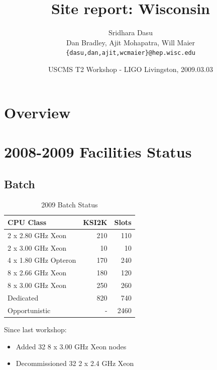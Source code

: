 \documentclass{beamer}
\title{Site report: Wisconsin}
\author[Maier]{
    Sridhara Dasu \\
    Dan Bradley, Ajit Mohapatra, Will Maier
    {\tt \{dasu,dan,ajit,wcmaier\}@hep.wisc.edu}}
\institute[Wisconsin]{University of Wisconsin - High Energy Physics}
\date[2009.03.03]{USCMS T2 Workshop - LIGO Livingston, 2009.03.03}
\begin{document}

\begin{frame}
    \titlepage
\end{frame}

\section{Overview}
\begin{frame}
    \tableofcontents
\end{frame}

\section{2008-2009 Facilities Status}
\subsection{Batch}
\begin{frame}
\begin{table}
\begin{tabular}{lrr}
    \toprule
    CPU Class               &   KSI2K   &   Slots \\
    \midrule
    2 x 2.80 GHz Xeon       &   210     &   110 \\  %
    2 x 3.00 GHz Xeon       &   10      &   10 \\   %
    4 x 1.80 GHz Opteron    &   170     &   240 \\  %
    8 x 2.66 GHz Xeon       &   180     &   120 \\  %
    8 x 3.00 GHz Xeon       &   250     &   260 \\  %
    \midrule
    Dedicated               &   820     &   740 \\
    Opportunistic           &   -       &   2460 \\
    \bottomrule
\end{tabular}
\caption{2009 Batch Status}
\label{2009_batch_status}
\end{table}

Since last workshop:
\begin{itemize}
    \item Added 32 8 x 3.00 GHz Xeon nodes
    \item Decommissioned 32 2 x 2.4 GHz Xeon
\end{itemize}
\end{frame}
\end{document}
